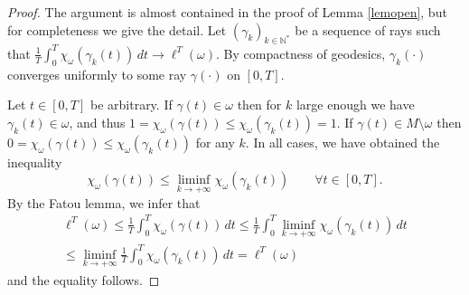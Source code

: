 \documentclass[JEP,XML,SOM,Unicode, NoEqCountersInSection,NoFloatCountersInSection,published]{cedram}
\def\N{\mathbb{N}}
\theoremstyle{definition}
\begin{document}
\begin{proof}
The argument is almost contained in the proof of Lemma \ref{lemopen}, but for completeness we give the detail.
Let $(\gamma_k)_{k\in\N^*}$ be a sequence of rays such that $\frac{1}{T}\int_0^T\chi_\omega(\gamma_k(t))\, dt \rightarrow \ell^T(\omega)$. By compactness of geodesics, $\gamma_k(\cdot)$ converges uniformly to some ray $\gamma(\cdot)$ on $[0,T]$.

Let $t\in[0,T]$ be arbitrary. If $\gamma(t)\in \omega$ then for $k$ large enough we have $\gamma_k(t)\in \omega$, and thus $1=\chi_{\omega}(\gamma(t))\leq \chi_{\omega}(\gamma_k(t))=1$. If $\gamma(t)\in M\setminus\omega$ then $0=\chi_{\omega}(\gamma(t))\leq \chi_{\omega}(\gamma_k(t))$ for any $k$. In all cases, we have obtained the inequality
\[
\chi_{\omega}(\gamma(t)) \leq \liminf_{k\rightarrow+\infty} \chi_{\omega}(\gamma_k(t)) \qquad \forall t\in[0,T].
\]
By the Fatou lemma, we infer that
\begin{multline*}
\ell^T(\omega)\leq \frac{1}{T}\int_0^T\chi_\omega(\gamma(t))\, dt \leq \frac{1}{T}\int_0^T \liminf_{k\rightarrow+\infty}\chi_\omega(\gamma_k(t))\, dt \\
\leq \liminf_{k\rightarrow+\infty} \frac{1}{T}\int_0^T \chi_\omega(\gamma_k(t))\, dt = \ell^T(\omega)
\end{multline*}
and the equality follows.
\end{proof}

\backmatter


\end{document}
